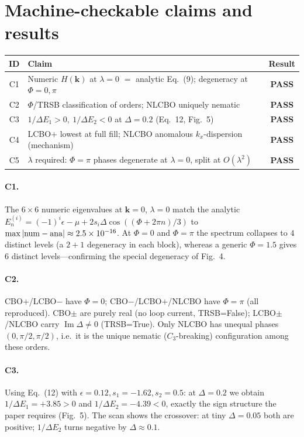 \documentclass[11pt]{article}
\newcommand{\PASS}{\textcolor{green!55!black}{\textbf{PASS}}}
\begin{document}
\section{Machine-checkable claims and results}
\begin{table}[h]\centering
\begin{tabular}{clc}
\toprule
ID & Claim & Result\\\midrule
C1 & Numeric $H(\mathbf k)$ at $\lambda=0$ $=$ analytic Eq.~(9); degeneracy at
$\Phi=0,\pi$ & \PASS\\
C2 & $\Phi$/TRSB classification of orders; NLCBO uniquely nematic & \PASS\\
C3 & $1/\Delta E_1>0,\ 1/\Delta E_2<0$ at $\Delta=0.2$ (Eq.~12, Fig.~5) & \PASS\\
C4 & LCBO$+$ lowest at full fill; NLCBO anomalous $k_x$-dispersion (mechanism) & \PASS\\
C5 & $\lambda$ required: $\Phi=\pi$ phases degenerate at $\lambda=0$, split at
$O(\lambda^2)$ & \PASS\\
\bottomrule
\end{tabular}
\end{table}

\paragraph{C1.} The $6\times6$ numeric eigenvalues at $\mathbf k=0$, $\lambda=0$
match the analytic $E_n^{(i)}=(-1)^i\epsilon-\mu+2s_i\Delta\cos((\Phi+2\pi n)/3)$ to
$\max|{\rm num}-{\rm ana}|\approx2.5\times10^{-16}$. At $\Phi=0$ and $\Phi=\pi$ the
spectrum collapses to $4$ distinct levels (a $2{+}1$ degeneracy in each block),
whereas a generic $\Phi=1.5$ gives $6$ distinct levels---confirming the special
degeneracy of Fig.~4.

\paragraph{C2.} CBO$+$/LCBO$-$ have $\Phi=0$; CBO$-$/LCBO$+$/NLCBO have $\Phi=\pi$
(all reproduced). CBO$\pm$ are purely real (no loop current, TRSB=False);
LCBO$\pm$/NLCBO carry $\operatorname{Im}\Delta\neq0$ (TRSB=True). Only NLCBO has
unequal phases $(0,\pi/2,\pi/2)$, i.e.\ it is the unique nematic ($C_3$-breaking)
configuration among these orders.

\paragraph{C3.} Using Eq.~(12) with $\epsilon=0.12,s_1=-1.62,s_2=0.5$: at
$\Delta=0.2$ we obtain $1/\Delta E_1=+3.85>0$ and $1/\Delta E_2=-4.39<0$, exactly
the sign structure the paper requires (Fig.~5). The scan shows the crossover: at
tiny $\Delta=0.05$ both are positive; $1/\Delta E_2$ turns negative by
$\Delta\approx0.1$.
\end{document}
